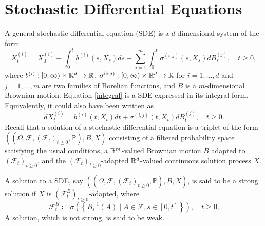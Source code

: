 \section{Stochastic Differential Equations}\label{section:SDE}
A general stochastic differential equation (SDE) is a $d$-dimensional system of the form
\begin{equation}\label{integral}
    X_{t}^{(i)}=X_{0}^{(i)}+ \int_{0}^{t}b^{(i)}(s,X_{s})ds+\sum_{j=1}^{m}\int_{0}^{t}\sigma^{(i,j)}(s,X_{s})dB_{s}^{(j)},\quad t\geq 0,
\end{equation}
where $b^{(i)}:[0,\infty)\times \mathbb{R}^{d}\to \mathbb{R}$, $\sigma^{(i,j)}:[0,\infty)\times\mathbb{R}^{d}\to\mathbb{R}$ for $i=1,\dots,d$ and $j=1,\dots,m$ are two families of Borelian functions, and $B$ is a $m$-dimensional Brownian motion. Equation \eqref{integral} is a SDE expressed in its integral form. Equivalently, it could also have been written as
\begin{equation}
    dX_{t}^{(i)}= b^{(i)}(t,X_{t})dt +\sigma^{(i,j)}(t,X_{t})dB_{t}^{(j)}, \quad t\geq 0.
\end{equation}
Recall that a solution of a stochastic differential equation is a triplet of the form \newline$\left((\Omega,\mathcal{F},(\mathcal{F}_{t})_{t\geq 0},\mathbb{P}),B,X\right)$ consisting of a filtered probability space satisfying the usual conditions, a $\mathbb{R}^{m}$-valued Brownian motion $B$ adapted to $(\mathcal{F}_{t})_{t\geq 0}$, and the $(\mathcal{F}_{t})_{t\geq 0}$-adapted $\mathbb{R}^{d}$-valued continuous solution process $X$.

A solution to a SDE, say $\left((\Omega,\mathcal{F},(\mathcal{F}_{t})_{t\geq 0},\mathbb{P}),B,X\right)$, is said to be a strong solution if $X$ is $(\mathcal{F}_{t}^{B})_{t\geq 0}$-adapted, where 
\begin{equation}
    \mathcal{F}_{t}^{B}\coloneqq \sigma\left(\left\{B_{s}^{-1}(A)\mid A\in\mathcal{F}, s\in [0,t] \right\}\right),\quad t\geq 0.
\end{equation}
A solution, which is not strong, is said to be weak. 

